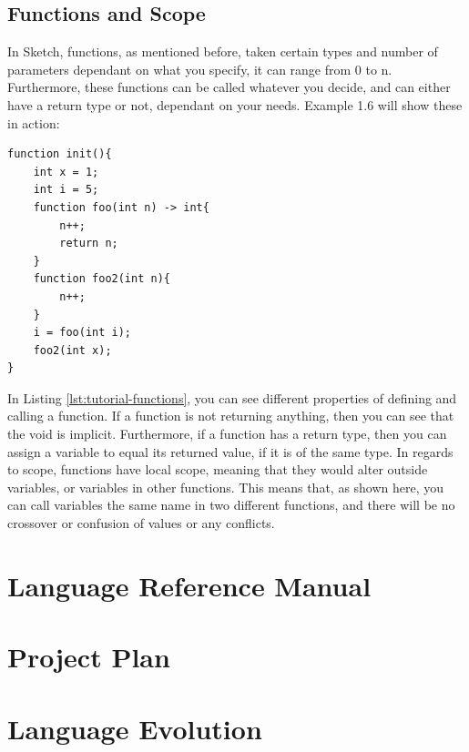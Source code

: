 \documentclass{l3proj}
\begin{document}
\section{Functions and Scope}
\label{func}
In Sketch, functions, as mentioned before, taken certain types and number of parameters dependant on what you specify, it can range from 0 to n. Furthermore, these functions can be called whatever you decide, and can either have a return type or not, dependant on your needs. Example 1.6 will show these in action:
\begin{lstlisting}[caption={Functions and Scope}, label={lst:tutorial-functions}]
function init(){
    int x = 1;
    int i = 5;
    function foo(int n) -> int{
        n++;
        return n;
    }
    function foo2(int n){
        n++;
    }
    i = foo(int i);
    foo2(int x);
}
\end{lstlisting}
In Listing \ref{lst:tutorial-functions}, you can see different properties of defining and calling a function. If a function is not returning anything, then you can see that the void is implicit. Furthermore, if a function has a return type, then you can assign a variable to equal its returned value, if it is of the same type. In regards to scope, functions have local scope, meaning that they would alter outside variables, or variables in other functions. This means that, as shown here, you can call variables the same name in two different functions, and there will be no crossover or confusion of values or any conflicts. 


\chapter{Language Reference Manual}
\label{manual}

\chapter{Project Plan}
\label{plan}

\chapter{Language Evolution}
\label{evo}

\end{document}
